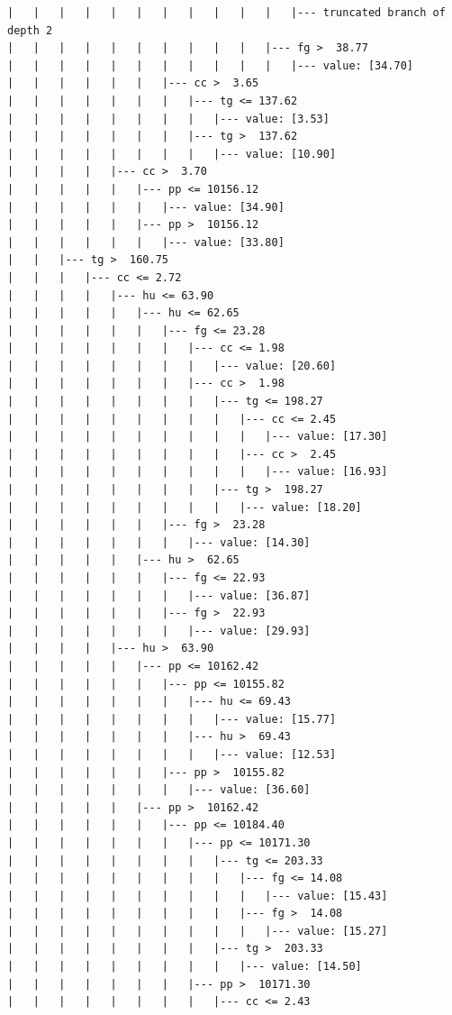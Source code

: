\documentclass[UTF8, a4paper]{ctexart}
\begin{document}
\begin{lstlisting}
|   |   |   |   |   |   |   |   |   |   |   |--- truncated branch of depth 2
|   |   |   |   |   |   |   |   |   |   |--- fg >  38.77
|   |   |   |   |   |   |   |   |   |   |   |--- value: [34.70]
|   |   |   |   |   |   |--- cc >  3.65
|   |   |   |   |   |   |   |--- tg <= 137.62
|   |   |   |   |   |   |   |   |--- value: [3.53]
|   |   |   |   |   |   |   |--- tg >  137.62
|   |   |   |   |   |   |   |   |--- value: [10.90]
|   |   |   |   |--- cc >  3.70
|   |   |   |   |   |--- pp <= 10156.12
|   |   |   |   |   |   |--- value: [34.90]
|   |   |   |   |   |--- pp >  10156.12
|   |   |   |   |   |   |--- value: [33.80]
|   |   |--- tg >  160.75
|   |   |   |--- cc <= 2.72
|   |   |   |   |--- hu <= 63.90
|   |   |   |   |   |--- hu <= 62.65
|   |   |   |   |   |   |--- fg <= 23.28
|   |   |   |   |   |   |   |--- cc <= 1.98
|   |   |   |   |   |   |   |   |--- value: [20.60]
|   |   |   |   |   |   |   |--- cc >  1.98
|   |   |   |   |   |   |   |   |--- tg <= 198.27
|   |   |   |   |   |   |   |   |   |--- cc <= 2.45
|   |   |   |   |   |   |   |   |   |   |--- value: [17.30]
|   |   |   |   |   |   |   |   |   |--- cc >  2.45
|   |   |   |   |   |   |   |   |   |   |--- value: [16.93]
|   |   |   |   |   |   |   |   |--- tg >  198.27
|   |   |   |   |   |   |   |   |   |--- value: [18.20]
|   |   |   |   |   |   |--- fg >  23.28
|   |   |   |   |   |   |   |--- value: [14.30]
|   |   |   |   |   |--- hu >  62.65
|   |   |   |   |   |   |--- fg <= 22.93
|   |   |   |   |   |   |   |--- value: [36.87]
|   |   |   |   |   |   |--- fg >  22.93
|   |   |   |   |   |   |   |--- value: [29.93]
|   |   |   |   |--- hu >  63.90
|   |   |   |   |   |--- pp <= 10162.42
|   |   |   |   |   |   |--- pp <= 10155.82
|   |   |   |   |   |   |   |--- hu <= 69.43
|   |   |   |   |   |   |   |   |--- value: [15.77]
|   |   |   |   |   |   |   |--- hu >  69.43
|   |   |   |   |   |   |   |   |--- value: [12.53]
|   |   |   |   |   |   |--- pp >  10155.82
|   |   |   |   |   |   |   |--- value: [36.60]
|   |   |   |   |   |--- pp >  10162.42
|   |   |   |   |   |   |--- pp <= 10184.40
|   |   |   |   |   |   |   |--- pp <= 10171.30
|   |   |   |   |   |   |   |   |--- tg <= 203.33
|   |   |   |   |   |   |   |   |   |--- fg <= 14.08
|   |   |   |   |   |   |   |   |   |   |--- value: [15.43]
|   |   |   |   |   |   |   |   |   |--- fg >  14.08
|   |   |   |   |   |   |   |   |   |   |--- value: [15.27]
|   |   |   |   |   |   |   |   |--- tg >  203.33
|   |   |   |   |   |   |   |   |   |--- value: [14.50]
|   |   |   |   |   |   |   |--- pp >  10171.30
|   |   |   |   |   |   |   |   |--- cc <= 2.43

\end{lstlisting}
\end{document}
